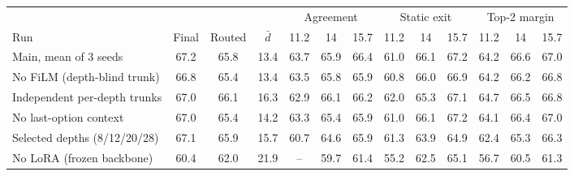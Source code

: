 \begin{tabular}{lccc|ccc|ccc|ccc}
\toprule
& & & & \multicolumn{3}{c|}{Agreement} & \multicolumn{3}{c|}{Static exit} & \multicolumn{3}{c}{Top-2 margin} \\
Run & Final & Routed & $\bar d$ & 11.2 & 14 & 15.7 & 11.2 & 14 & 15.7 & 11.2 & 14 & 15.7 \\
\midrule
Main, mean of 3 seeds & 67.2 & 65.8 & 13.4 & 63.7 & 65.9 & 66.4 & 61.0 & 66.1 & 67.2 & 64.2 & 66.6 & 67.0 \\
No FiLM (depth-blind trunk) & 66.8 & 65.4 & 13.4 & 63.5 & 65.8 & 65.9 & 60.8 & 66.0 & 66.9 & 64.2 & 66.2 & 66.8 \\
Independent per-depth trunks & 67.0 & 66.1 & 16.3 & 62.9 & 66.1 & 66.2 & 62.0 & 65.3 & 67.1 & 64.7 & 66.5 & 66.8 \\
No last-option context & 67.0 & 65.4 & 14.2 & 63.3 & 65.4 & 65.9 & 61.0 & 66.1 & 67.2 & 64.1 & 66.4 & 67.0 \\
Selected depths (8/12/20/28) & 67.1 & 65.9 & 15.7 & 60.7 & 64.6 & 65.9 & 61.3 & 63.9 & 64.9 & 62.4 & 65.3 & 66.3 \\
No LoRA (frozen backbone) & 60.4 & 62.0 & 21.9 & – & 59.7 & 61.4 & 55.2 & 62.5 & 65.1 & 56.7 & 60.5 & 61.3 \\
\bottomrule
\end{tabular}

